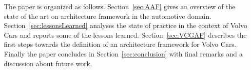 \documentclass[preprint,12pt,3p]{elsarticle}
\begin{document}
The paper is organized as follows. Section~\ref{sec:AAF} gives an 
 overview of the state of the art on architecture framework in the automotive domain. Section~\ref{sec:lessonsLearned} analyses the state of practice in the context of Volvo Cars and reports some of the lessons learned. Section~\ref{sec:VCGAF} describes the first steps towards the definition of an architecture framework for Volvo Cars.
Finally the paper concludes in Section~\ref{sec:conclusion} with final remarks and a discussion about future work. 










% 
% 
% 
% 
% 
% 
% 
% 
% 
% 
% 
% 


\end{document}

